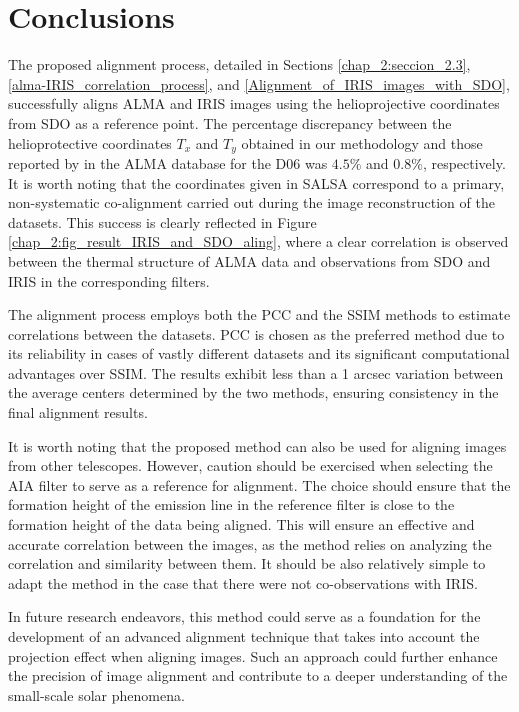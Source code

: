 \documentclass[a4paper,alpha-refs]{eSpectra}
\begin{document}
\section{Conclusions}
The proposed alignment process, detailed in   Sections \ref{chap_2:seccion_2.3}, \ref{alma-IRIS_correlation_process}, and \ref{Alignment_of_IRIS_images_with_SDO},
successfully aligns ALMA and IRIS images using the helioprojective coordinates from SDO as a reference point. The percentage discrepancy between the helioprotective coordinates $T_x$ and $T_y$ obtained in our methodology and those reported by \cite{SALSA_guia} in the ALMA database for the D06 was $4.5\%$ and $0.8\%$, respectively. It is worth noting that the coordinates given in SALSA correspond to a primary, non-systematic co-alignment carried out during the image reconstruction of the datasets. This success is clearly reflected in Figure \ref{chap_2:fig_result_IRIS_and_SDO_aling}, where a clear correlation is observed between the thermal structure of ALMA data and observations from SDO and IRIS in the corresponding filters.

The alignment process employs both the PCC and the SSIM methods to estimate correlations between the datasets. PCC is chosen as the preferred method due to its reliability in cases of vastly different datasets and its significant computational advantages over SSIM. The results exhibit less than a 1 arcsec variation between the average centers determined by the two methods, ensuring consistency in the final alignment results.


It is worth noting that the proposed method can also be used for aligning images from other telescopes. However, caution should be exercised when selecting the AIA filter to serve as a reference for alignment. The choice should ensure that the formation height of the emission line in the reference filter is close to the formation height of the data being aligned. This will ensure an effective and accurate correlation between the images, as the method relies on analyzing the correlation and similarity between them. It should be also relatively simple to adapt the method in the case that there were not co-observations with IRIS.

In future research endeavors, this method could serve as a foundation for the development of an advanced alignment technique that takes into account the projection effect when aligning images. Such an approach could further enhance the precision of image alignment and contribute to a deeper understanding of the small-scale solar phenomena.
\end{document}
